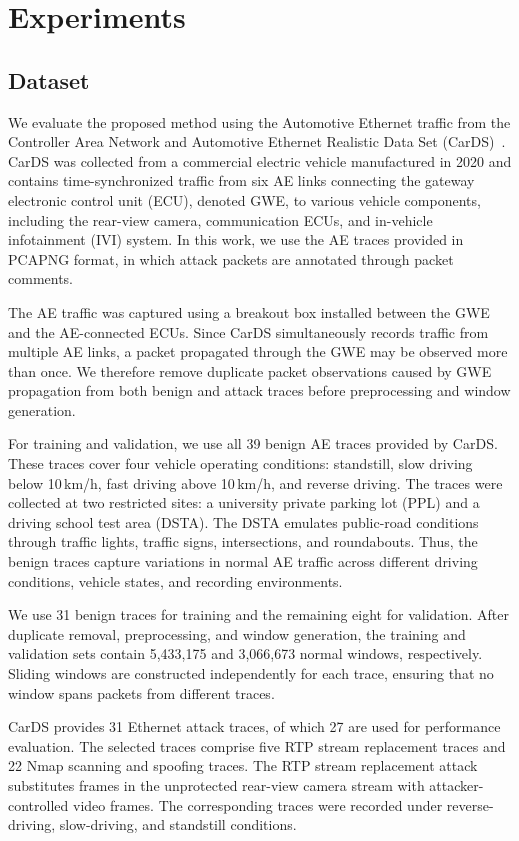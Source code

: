 \section{Experiments}
\label{sec:experiments}
\subsection{Dataset}
We evaluate the proposed method using the Automotive Ethernet traffic from the Controller Area Network and Automotive Ethernet Realistic Data Set (CarDS)~\cite{hellemans2025cards}. CarDS was collected from a commercial electric vehicle manufactured in 2020 and contains time-synchronized traffic from six AE links connecting the gateway electronic control unit (ECU), denoted GWE, to various vehicle components, including the rear-view camera, communication ECUs, and in-vehicle infotainment (IVI) system. In this work, we use the AE traces provided in PCAPNG format, in which attack packets are annotated through packet comments.

The AE traffic was captured using a breakout box installed between the GWE and the AE-connected ECUs. Since CarDS simultaneously records traffic from multiple AE links, a packet propagated through the GWE may be observed more than once. We therefore remove duplicate packet observations caused by GWE propagation from both benign and attack traces before preprocessing and window generation.

For training and validation, we use all 39 benign AE traces provided by CarDS. These traces cover four vehicle operating conditions: standstill, slow driving below 10\,km/h, fast driving above 10\,km/h, and reverse driving. The traces were collected at two restricted sites: a university private parking lot (PPL) and a driving school test area (DSTA). The DSTA emulates public-road conditions through traffic lights, traffic signs, intersections, and roundabouts. Thus, the benign traces capture variations in normal AE traffic across different driving conditions, vehicle states, and recording environments.

We use 31 benign traces for training and the remaining eight for validation. After duplicate removal, preprocessing, and window generation, the training and validation sets contain 5,433,175 and 3,066,673 normal windows, respectively. Sliding windows are constructed independently for each trace, ensuring that no window spans packets from different traces.

CarDS provides 31 Ethernet attack traces, of which 27 are used for performance evaluation. The selected traces comprise five RTP stream replacement traces and 22 Nmap scanning and spoofing traces. The RTP stream replacement attack substitutes frames in the unprotected rear-view camera stream with attacker-controlled video frames. The corresponding traces were recorded under reverse-driving, slow-driving, and standstill conditions.

